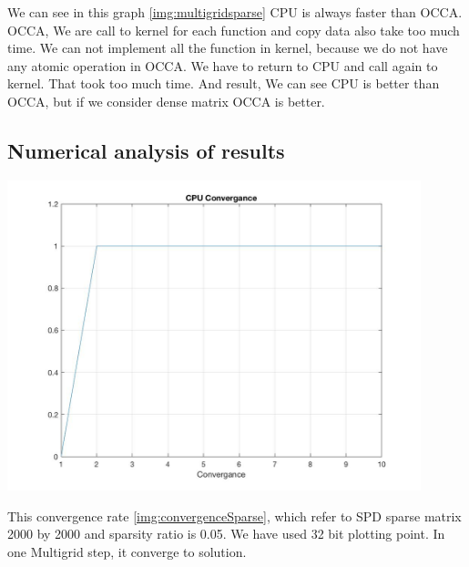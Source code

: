 We can see in this graph \ref{img:multigridsparse} CPU is always faster than OCCA. OCCA, We are call to kernel for each function and copy data also take too much time. We can not implement all the function in kernel, because we do not have any atomic operation in OCCA. We have to return to CPU and call again to kernel. That took too much time. And result, We can see CPU is better than OCCA, but if we consider dense matrix OCCA is better.




\subsection{Numerical analysis of results}
\begin{center}
	\includegraphics[width = 12cm]{Chapters/cpu_convergence}
	\label{img:convergenceSparse}
\end{center}

This convergence rate \ref{img:convergenceSparse}, which refer to SPD sparse matrix 2000 by 2000 and sparsity ratio is 0.05. We have used 32 bit plotting point. In one Multigrid step, it converge to solution. 













 